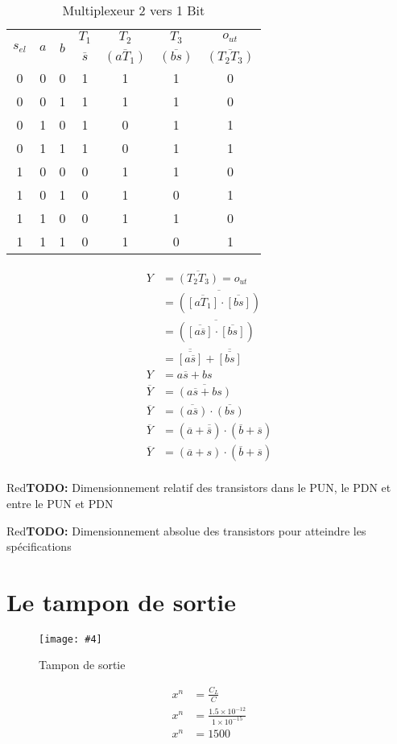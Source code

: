 \documentclass[a11paper]{article}
\newcommand{\todo}[1]{\begin{color}{Red}\textbf{TODO:} #1\end{color}}
\newcommand{\quicktab}[4]{
  \begin{table}[H]
    \centering
    \caption{#1}
    \label{tab:#2}
    \begin{tabular}{#3}
      #4
    \end{tabular}
  \end{table}
}
\newcommand{\quickfig}[4]{
\begin{figure}[H]
  \centering
  \texttt{[image: \#4]}
  \caption{#1}
  \label{fig:#2}
\end{figure}
}
\begin{document}
\quicktab{Multiplexeur 2 vers 1 Bit}{mux2x1b}{ccccccc}{
  \toprule
  \multirow{2}{*}{$s_{el}$} &
  \multirow{2}{*}{$a$} &
  \multirow{2}{*}{$b$} &
  $T_1$ &
  $T_2$ &
  $T_3$ &
  $o_{ut}$ \\
  & & &
  $\overline{s}$ &
  $\overline{(aT_1)}$ &
  $\overline{(bs)}$ &
  $\overline{(T_2T_3)}$ \\
  \midrule
  0&0&0&1&1&1&0 \\
  0&0&1&1&1&1&0 \\
  0&1&0&1&0&1&1 \\
  0&1&1&1&0&1&1 \\
  1&0&0&0&1&1&0 \\
  1&0&1&0&1&0&1 \\
  1&1&0&0&1&1&0 \\
  1&1&1&0&1&0&1
  \\
  \bottomrule
}

\begin{align}
  Y &= \overline{(T_2T_3)} = o_{ut}  \\
  &= \overline{(\overline{[aT_1]}\cdot\overline{[bs]} )} \\
  &= \overline{(\overline{[a\overline{s}]}\cdot\overline{[bs]} )} \\
  &= \overline{\overline{[a\overline{s}]}} + \overline{\overline{[bs]}} \\
  Y &= a\overline{s} + bs \\
  \overline{Y} &= \overline{(a\overline{s} + bs)} \\
  \overline{Y} &= \overline{(a\overline{s})} \cdot \overline{(bs)} \\
  \overline{Y} &= (\overline{a}+\overline{\overline{s}}) \cdot (\overline{b}+\overline{s}) \\
  \overline{Y} &= (\overline{a}+s) \cdot (\overline{b}+\overline{s}) \\
\end{align}

\todo{Dimensionnement relatif des transistors dans le PUN, le PDN et entre le PUN et PDN}
\todo{Dimensionnement absolue des transistors pour atteindre les spécifications}

\newpage
\section{Le tampon de sortie}
\quickfig{Tampon de sortie}{pad_buffer}{.5}{assets/pad_buffer.png}


\begin{align}
  x^n &= \frac{C_L}{C} \\
  x^n &= \frac{1.5\times10^{-12}}{1\times10^{-15}} \\
  x^n &= 1500
\end{align}
\end{document}
